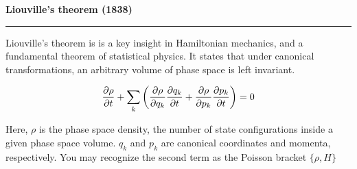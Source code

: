 
\begin{frame}
	\begin{block}{\color{white}\textbf{\Large{
				    Liouville's theorem (1838)
		}}}
		\vspace{-10pt}\rule{\textwidth}{0.5pt}
		\color{white}
		
	Liouville's theorem is is a key insight in Hamiltonian mechanics, and a fundamental theorem of statistical physics. It states that under canonical transformations, an arbitrary volume of phase space is left invariant.

	\end{block}
	{\large
		
		\begin{equation*} 
			\pdv{\rho}{t} + \sum_k\left(\pdv{\rho}{q_k}\pdv{q_k}{t} + \pdv{\rho}{p_k}\pdv{p_k}{t}\right) = 0 
		\end{equation*}
	}
	
	\begin{block}{}
		\color{white}
		Here, $\rho$ is the phase space density, the number of state configurations inside a given phase space volume. $q_k$ and $p_k$ are canonical coordinates and momenta, respectively. 
		You may recognize the second term as the Poisson bracket $\{\rho, H\}$
		
	\end{block}
	
	
\end{frame}